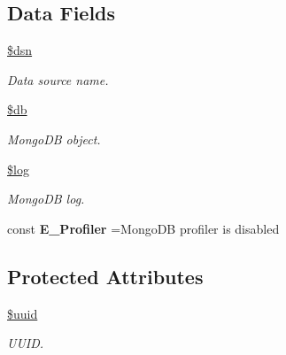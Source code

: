 \subsection*{Data Fields}
\begin{DoxyCompactItemize}
\item 
\hypertarget{class_d_b_1_1_mongo_a6441cca8c9fa11e16d2017e8cb733c10}{}\label{class_d_b_1_1_mongo_a6441cca8c9fa11e16d2017e8cb733c10} 
\hyperlink{class_d_b_1_1_mongo_a6441cca8c9fa11e16d2017e8cb733c10}{\$dsn}
\begin{DoxyCompactList}\small\item\em Data source name. \end{DoxyCompactList}\item 
\hypertarget{class_d_b_1_1_mongo_a1fa3127fc82f96b1436d871ef02be319}{}\label{class_d_b_1_1_mongo_a1fa3127fc82f96b1436d871ef02be319} 
\hyperlink{class_d_b_1_1_mongo_a1fa3127fc82f96b1436d871ef02be319}{\$db}
\begin{DoxyCompactList}\small\item\em Mongo\+DB object. \end{DoxyCompactList}\item 
\hypertarget{class_d_b_1_1_mongo_a9a2cf15a653aee8be437f7ae474cd494}{}\label{class_d_b_1_1_mongo_a9a2cf15a653aee8be437f7ae474cd494} 
\hyperlink{class_d_b_1_1_mongo_a9a2cf15a653aee8be437f7ae474cd494}{\$log}
\begin{DoxyCompactList}\small\item\em Mongo\+DB log. \end{DoxyCompactList}\end{DoxyCompactItemize}
{\bf }\par
\begin{DoxyCompactItemize}
\item 
\hypertarget{class_d_b_1_1_mongo_aac8168595b57df20e08da6fabf876aec}{}\label{class_d_b_1_1_mongo_aac8168595b57df20e08da6fabf876aec} 
const {\bfseries E\+\_\+\+Profiler} =\textquotesingle{}Mongo\+DB profiler is disabled\textquotesingle{}
\end{DoxyCompactItemize}

\subsection*{Protected Attributes}
\begin{DoxyCompactItemize}
\item 
\hypertarget{class_d_b_1_1_mongo_aeccc2a337445686487ea085278c79eff}{}\label{class_d_b_1_1_mongo_aeccc2a337445686487ea085278c79eff} 
\hyperlink{class_d_b_1_1_mongo_aeccc2a337445686487ea085278c79eff}{\$uuid}
\begin{DoxyCompactList}\small\item\em U\+U\+ID. \end{DoxyCompactList}\end{DoxyCompactItemize}


